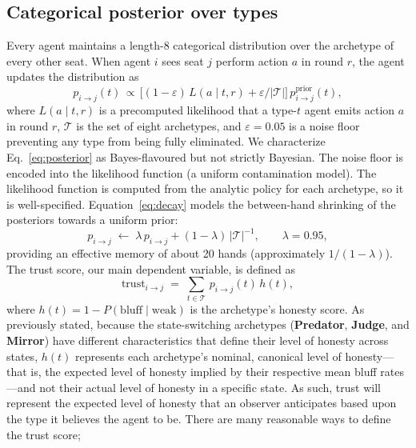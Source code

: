 \documentclass[10pt]{article} %
\newcommand{\arch}[1]{\textbf{#1}}
\begin{document}
\subsection{Categorical posterior over types}\label{sec:posterior}
Every agent maintains a length-8 categorical distribution over the
archetype of every other seat. When agent $i$ sees seat $j$ perform
action $a$ in round $r$, the agent updates the distribution as
\begin{equation}
  p_{i\to j}(t)\,\propto\,
    \bigl[(1-\varepsilon)\,L(a\mid t,r)
          + \varepsilon/|\mathcal{T}|\bigr]\,
    p_{i\to j}^{\text{prior}}(t),
  \label{eq:posterior}
\end{equation}
where $L(a\mid t, r)$ is a precomputed likelihood that a type-$t$
agent emits action $a$ in round $r$, $\mathcal{T}$ is the set of
eight archetypes, and $\varepsilon = 0.05$ is a noise floor
preventing any type from being fully eliminated. We characterize
Eq.~\ref{eq:posterior} as Bayes-flavoured but not strictly
Bayesian. The noise floor is encoded into the likelihood function
(a uniform contamination model). The likelihood function is computed
from the analytic policy for each archetype, so it is well-specified.
Equation~\ref{eq:decay} models the between-hand shrinking of the
posteriors towards a uniform prior:
\begin{equation}
  p_{i\to j} \;\leftarrow\;
    \lambda\,p_{i\to j} + (1-\lambda)\,|\mathcal{T}|^{-1},
  \qquad \lambda = 0.95,
  \label{eq:decay}
\end{equation}
providing an effective memory of about 20 hands (approximately
$1/(1-\lambda)$). The trust score, our main dependent variable, is
defined as
\begin{equation}
  \text{trust}_{i\to j} \;=\;
    \sum_{t\in\mathcal{T}}\, p_{i\to j}(t)\, h(t),
  \label{eq:trust}
\end{equation}
where $h(t) = 1 - P(\text{bluff}\mid\text{weak})$ is the
archetype's honesty
score. As previously stated, because the state-switching archetypes
(\arch{Predator}, \arch{Judge}, and \arch{Mirror}) have different
characteristics that define their level of honesty across states,
$h(t)$ represents each archetype's nominal, canonical level of
honesty---that is, the expected level of honesty implied by their
respective mean bluff rates---and not their actual level of honesty
in a specific state. As such, trust will represent the expected level
of honesty that an observer anticipates based upon the type it
believes the agent to be. There are many reasonable ways to define the trust score;
\end{document}
